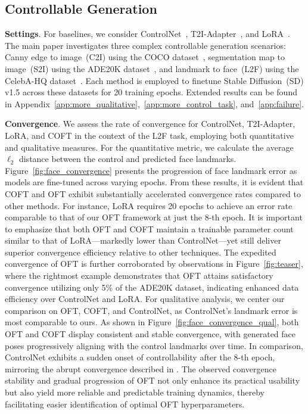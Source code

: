 \subsection{Controllable Generation}

\textbf{Settings}. For baselines, we consider ControlNet~\cite{zhang2023adding}, T2I-Adapter~\cite{mou2023t2i}, and LoRA~\cite{hulora2022}. The main paper investigates three complex controllable generation scenarios: Canny edge to image~(C2I) using the COCO dataset~\cite{lin2014microsoft}, segmentation map to image~(S2I) using the ADE20K dataset~\cite{zhou2017scene}, and landmark to face~(L2F) using the CelebA-HQ dataset~\cite{karras2018progressive,xia2021tedigan}. Each method is employed to finetune Stable Diffusion~(SD) v1.5 across these datasets for 20 training epochs. Extended results can be found in Appendix~\ref{app:more_qualitative},~\ref{app:more_control_task}, and~\ref{app:failure}.

\textbf{Convergence}. We assess the rate of convergence for ControlNet, T2I-Adapter, LoRA, and COFT in the context of the L2F task, employing both quantitative and qualitative measures. For the quantitative metric, we calculate the average $\ell_2$ distance between the control and predicted face landmarks. Figure~\ref{fig:face_convergence} presents the progression of face landmark error as models are fine-tuned across varying epochs. From these results, it is evident that COFT and OFT exhibit substantially accelerated convergence rates compared to other methods. For instance, LoRA requires 20 epochs to achieve an error rate comparable to that of our OFT framework at just the 8-th epoch. It is important to emphasize that both OFT and COFT maintain a trainable parameter count similar to that of LoRA—markedly lower than ControlNet—yet still deliver superior convergence efficiency relative to other techniques. The expedited convergence of OFT is further corroborated by observations in Figure~\ref{fig:teaser}, where the rightmost example demonstrates that OFT attains satisfactory convergence utilizing only 5\% of the ADE20K dataset, indicating enhanced data efficiency over ControlNet and LoRA. For qualitative analysis, we center our comparison on OFT, COFT, and ControlNet, as ControlNet’s landmark error is most comparable to ours. As shown in Figure~\ref{fig:face_convergence_qual}, both OFT and COFT display consistent and stable convergence, with generated face poses progressively aligning with the control landmarks over time. In comparison, ControlNet exhibits a sudden onset of controllability after the 8-th epoch, mirroring the abrupt convergence described in \cite{zhang2023adding}. The observed convergence stability and gradual progression of OFT not only enhance its practical usability but also yield more reliable and predictable training dynamics, thereby facilitating easier identification of optimal OFT hyperparameters.

